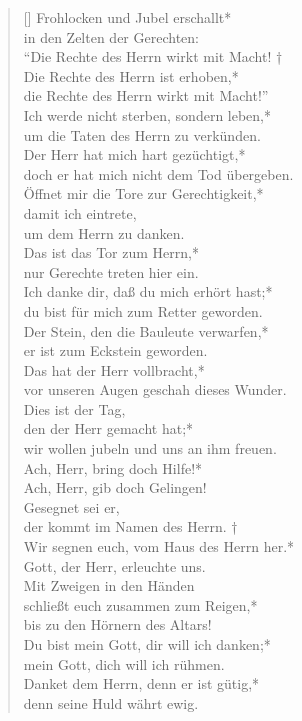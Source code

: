 \begin{verse}[\versewidth]
Frohlocken und Jubel erschallt*\\
in den Zelten der Gerechten:\\
\vin ``Die Rechte des Herrn wirkt mit Macht! †\\
\vin Die Rechte des Herrn ist erhoben,*\\
\vin die Rechte des Herrn wirkt mit Macht!''\\
Ich werde nicht sterben, sondern leben,*\\
um die Taten des Herrn zu verkünden.\\
\vin Der Herr hat mich hart gezüchtigt,*\\
\vin doch er hat mich nicht dem Tod übergeben.\\
Öffnet mir die Tore zur Gerechtigkeit,*\\
damit ich eintrete,\\
um dem Herrn zu danken.\\
\vin Das ist das Tor zum Herrn,*\\
\vin nur Gerechte treten hier ein.\\
Ich danke dir, daß du mich erhört hast;*\\
du bist für mich zum Retter geworden.\\
\vin Der Stein, den die Bauleute verwarfen,*\\
\vin er ist zum Eckstein geworden.\\
Das hat der Herr vollbracht,*\\
vor unseren Augen geschah dieses Wunder.\\
\vin Dies ist der Tag,\\
\vin den der Herr gemacht hat;*\\
\vin wir wollen jubeln und uns an ihm freuen.\\
Ach, Herr, bring doch Hilfe!*\\
Ach, Herr, gib doch Gelingen!\\
\vin Gesegnet sei er,\\
\vin der kommt im Namen des Herrn. †\\ 
\vin Wir segnen euch, vom Haus des Herrn her.*\\
\vin Gott, der Herr, erleuchte uns.\\
Mit Zweigen in den Händen\\
schließt euch zusammen zum Reigen,*\\
bis zu den Hörnern des Altars!\\
\vin Du bist mein Gott, dir will ich danken;*\\
\vin mein Gott, dich will ich rühmen.\\
Danket dem Herrn, denn er ist gütig,*\\
denn seine Huld währt ewig.\\

\end{verse}

